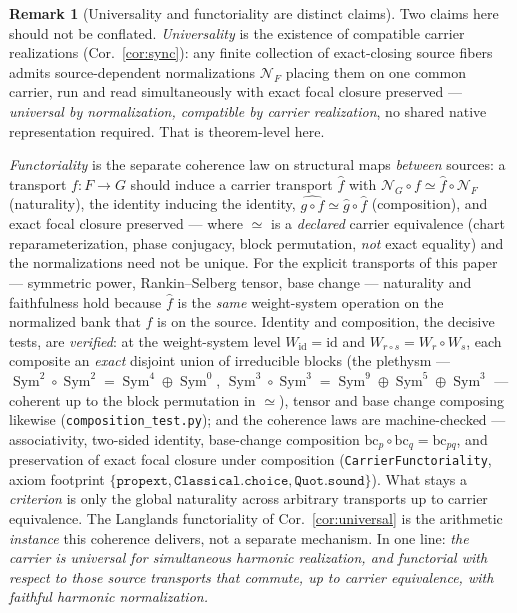 \documentclass[11pt]{article}
\theoremstyle{definition}
\newtheorem{remark}[theorem]{Remark}
\newcommand{\Sym}{\operatorname{Sym}}
\begin{document}
\begin{remark}[Universality and functoriality are distinct claims]\label{rem:functor}
Two claims here should not be conflated. \emph{Universality} is the existence of compatible carrier realizations
(Cor.~\ref{cor:sync}): any finite collection of exact-closing source fibers admits source-dependent
normalizations $\mathcal N_F$ placing them on one common carrier, run and read simultaneously with exact focal
closure preserved --- \emph{universal by normalization, compatible by carrier realization}, no shared native
representation required. That is theorem-level here.

\emph{Functoriality} is the separate coherence law on structural maps \emph{between} sources: a transport
$f\colon F\to G$ should induce a carrier transport $\widehat f$ with $\mathcal N_G\circ f\simeq\widehat f\circ
\mathcal N_F$ (naturality), the identity inducing the identity, $\widehat{g\circ f}\simeq\widehat g\circ\widehat
f$ (composition), and exact focal closure preserved --- where $\simeq$ is a \emph{declared} carrier equivalence
(chart reparameterization, phase conjugacy, block permutation, \emph{not} exact equality) and the normalizations
need not be unique. For the explicit transports of this paper --- symmetric power, Rankin--Selberg tensor, base
change --- naturality and faithfulness hold because $\widehat f$ is the \emph{same} weight-system operation on the
normalized bank that $f$ is on the source. Identity and composition, the decisive tests, are \emph{verified}: at
the weight-system level $W_{\mathrm{id}}=\mathrm{id}$ and $W_{r\circ s}=W_r\circ W_s$, each composite an
\emph{exact} disjoint union of irreducible blocks (the plethysm --- $\Sym^2\!\circ\Sym^2=\Sym^4\oplus\Sym^0$,
$\Sym^3\!\circ\Sym^3=\Sym^9\oplus\Sym^5\oplus\Sym^3$ --- coherent up to the block permutation in $\simeq$), tensor
and base change composing likewise (\texttt{composition\_test.py}); and the coherence laws are machine-checked ---
associativity, two-sided identity, base-change composition $\mathrm{bc}_p\circ\mathrm{bc}_q=\mathrm{bc}_{pq}$, and
preservation of exact focal closure under composition (\texttt{CarrierFunctoriality}, axiom footprint
$\{\texttt{propext},\texttt{Classical.choice},\texttt{Quot.sound}\}$). What stays a \emph{criterion} is only the
global naturality across arbitrary transports up to carrier equivalence. The Langlands functoriality of
Cor.~\ref{cor:universal} is the arithmetic \emph{instance} this coherence delivers, not a separate mechanism. In
one line: \emph{the carrier is universal for simultaneous harmonic realization, and functorial with respect to
those source transports that commute, up to carrier equivalence, with faithful harmonic normalization.}
\end{remark}
\end{document}
